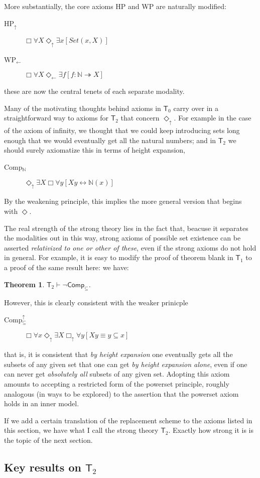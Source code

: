 \documentclass{article}
\newcommand{\du}{\Diamond_\uparrow}
\newcommand{\dl}{\Diamond_\leftarrow}
\newcommand{\bu}{\Box_\uparrow}
\newtheorem{theorem}{Theorem}
\begin{document}
More substantially, the core axioms HP and WP are naturally modified:
\begin{description} 
    \item[HP$_\uparrow$] $\Box \forall X \du \exists x [Set(x, X)]$
    \item[WP$_\leftarrow$] $\Box \forall X \dl \exists f[f : \mathbb{N} \twoheadrightarrow X]$
\end{description}
these are now the central tenets of each separate modality. 

Many of the motivating thoughts behind axioms in $\mathsf{T}_0$
carry over in a straightforward way to axioms for $\mathsf{T}_2$ that concern $\du$.
For example in the case of the axiom of infinity, we thought that we could keep introducing 
sets long enough that we would eventually get all the natural numbers; and in $\mathsf{T}_2$ we 
should surely axiomatize this in terms of height expansion,

\begin{description}
    \item[Comp$_\mathbb{N}$]
    $\du \exists X \Box \forall y[ Xy \leftrightarrow \mathbb{N}(x)]$
\end{description}
By the weakening principle, 
this implies the more general version that begins with $\Diamond$.

The real strength of the strong theory 
lies in the fact that, beacuse it separates the modalities out in this way, 
strong axioms of possible set existence can be asserted \emph{relativized to one 
or other of these}, even if the strong axioms do not hold in general. For example, 
it is easy to modify the proof of theorem blank in $\mathsf{T}_1$ to a proof of the same result here:
we have:
\begin{theorem}
    $\mathsf{T}_2 \vdash \neg \mathsf{Comp}_\subseteq$.
\end{theorem}
However, this is clearly consistent with the weaker prinicple
\begin{description}
    \item[Comp$_\subseteq^\uparrow$] $\Box \forall x \du \exists X \bu \forall y[Xy \equiv y \subseteq x]$
\end{description}
that is, it is consistent that \emph{by height expansion} one eventually gets all the subsets 
of any given set that one can get \emph{by height expansion alone}, even if one can never get 
\emph{absolutely all} subsets of any given set. Adopting this axiom amounts to accepting 
a restricted form of the powerset principle, roughly analogous (in ways to be explored) 
to the assertion that the powerset axiom holds in an inner model. 

If we add a certain translation of the replacement scheme to the axioms listed in this section, 
we have what I call the strong theory $\mathsf{T}_2$. Exactly how strong it is is the topic 
of the next section.

\subsection{Key results on $\mathsf{T}_2$}
\end{document}
